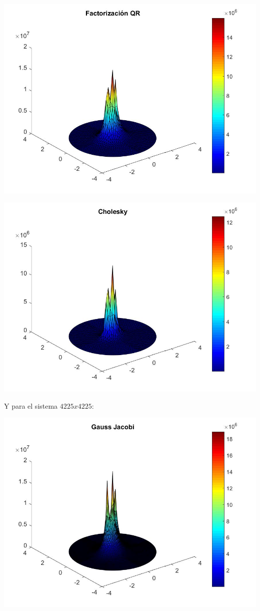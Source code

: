 \documentclass{memoria}
\begin{document}
{\includegraphics[width=16cm]{imagenes/SE/Resultados1089_QR.jpg}}

{\includegraphics[width=16cm]{imagenes/SE/Resultados1089_Ch.jpg}}

Y para el sistema $4225x4225$:

{\includegraphics[width=16cm]{imagenes/SE/Resultados4225_GJ.jpg}}
\end{document}
